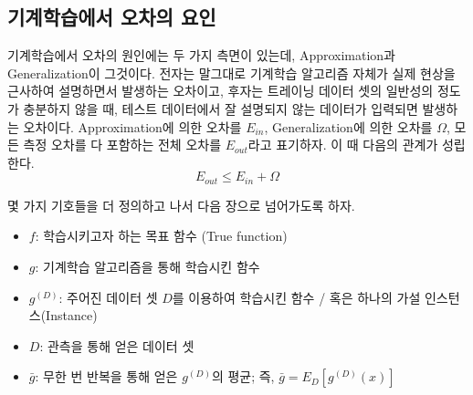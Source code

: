 \documentclass[a4paper]{oblivoir}
\begin{document}
\subsection{기계학습에서 오차의 요인}
기계학습에서 오차의 원인에는 두 가지 측면이 있는데, Approximation과 Generalization이 그것이다. 전자는 말그대로 기계학습 알고리즘 자체가 실제 현상을 근사하여 설명하면서 발생하는 오차이고, 후자는 트레이닝 데이터 셋의 일반성의 정도가 충분하지 않을 때, 테스트 데이터에서 잘 설명되지 않는 데이터가 입력되면 발생하는 오차이다. Approximation에 의한 오차를 $E_{in}$, Generalization에 의한 오차를 $\Omega$, 모든 측정 오차를 다 포함하는 전체 오차를 $E_{out}$라고 표기하자. 이 때 다음의 관계가 성립한다.
\begin{equation}E_{out} \leq E_{in} + \Omega \tag{6-1} \end{equation}

\indent 몇 가지 기호들을 더 정의하고 나서 다음 장으로 넘어가도록 하자.
\begin{itemize}\itemsep0pt
\item $f$: 학습시키고자 하는 목표 함수 (True function)
\item $g$: 기계학습 알고리즘을 통해 학습시킨 함수
\item $g^{(D)}$: 주어진 데이터 셋 $D$를 이용하여 학습시킨 함수 / 혹은 하나의 가설 인스턴스(Instance)
\item $D$: 관측을 통해 얻은 데이터 셋
\item $\bar{g}$: 무한 번 반복을 통해 얻은 $g^{(D)}$의 평균; 즉, $\bar{g} = E_{D}[g^{(D)}(x)]$
\end{itemize}

\end{document}
